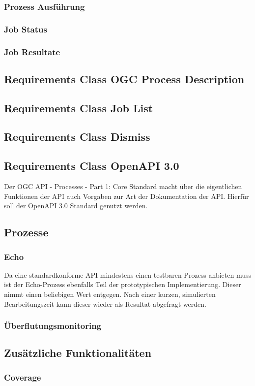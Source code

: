 \subsubsection{Prozess Ausführung}
\subsubsection{Job Status}
\subsubsection{Job Resultate}
\subsection{Requirements Class OGC Process Description}
\subsection{Requirements Class Job List}
\subsection{Requirements Class Dismiss}
\subsection{Requirements Class OpenAPI 3.0}
Der OGC API - Processes - Part 1: Core Standard macht über die eigentlichen Funktionen der API auch Vorgaben zur Art der Dokumentation der API. Hierfür soll der 
OpenAPI 3.0 Standard genutzt werden. 
\subsection{Prozesse}
\subsubsection{Echo}
Da eine standardkonforme API mindestens einen testbaren Prozess anbieten muss ist der Echo-Prozess ebenfalls Teil der prototypischen Implementierung. 
Dieser nimmt einen beliebigen Wert entgegen. Nach einer kurzen, simulierten Bearbeitungszeit kann dieser wieder als Resultat abgefragt werden. 
\subsubsection{Überflutungsmonitoring}
\subsection{Zusätzliche Funktionalitäten}
\subsubsection{Coverage} 